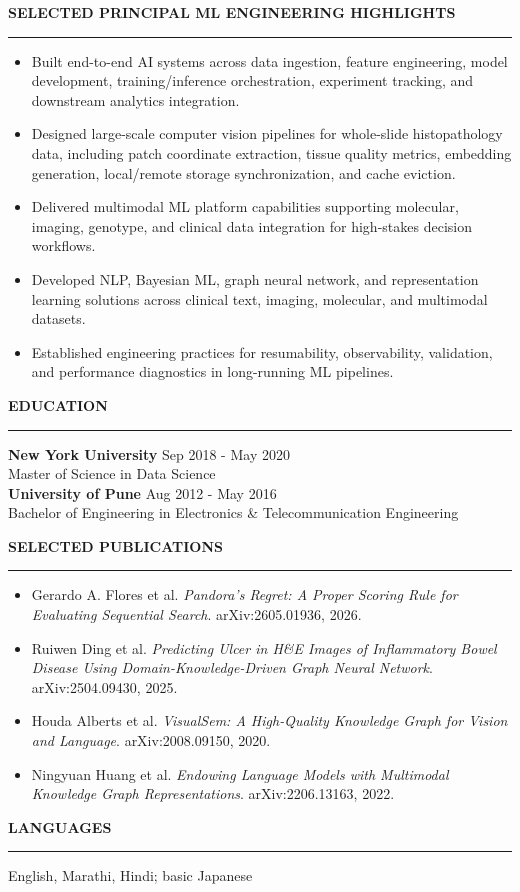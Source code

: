 \documentclass[10pt,letterpaper]{article}
\newcommand{\resumelist}{\begin{itemize}\setlength{\itemsep}{1.2pt}\setlength{\parskip}{0pt}\setlength{\parsep}{0pt}}
\newcommand{\resumelistend}{\end{itemize}}
\begin{document}
\vspace{6pt}\textcolor{accent}{\large\bfseries SELECTED PRINCIPAL ML ENGINEERING HIGHLIGHTS}\vspace{2pt}\hrule\vspace{4pt}
\resumelist
  \item Built end-to-end AI systems across data ingestion, feature engineering, model development, training/inference orchestration, experiment tracking, and downstream analytics integration.
  \item Designed large-scale computer vision pipelines for whole-slide histopathology data, including patch coordinate extraction, tissue quality metrics, embedding generation, local/remote storage synchronization, and cache eviction.
  \item Delivered multimodal ML platform capabilities supporting molecular, imaging, genotype, and clinical data integration for high-stakes decision workflows.
  \item Developed NLP, Bayesian ML, graph neural network, and representation learning solutions across clinical text, imaging, molecular, and multimodal datasets.
  \item Established engineering practices for resumability, observability, validation, and performance diagnostics in long-running ML pipelines.
\resumelistend

\vspace{6pt}\textcolor{accent}{\large\bfseries EDUCATION}\vspace{2pt}\hrule\vspace{4pt}
\textbf{New York University} \hfill Sep 2018 - May 2020\\
Master of Science in Data Science\\[2pt]
\textbf{University of Pune} \hfill Aug 2012 - May 2016\\
Bachelor of Engineering in Electronics \& Telecommunication Engineering

\vspace{6pt}\textcolor{accent}{\large\bfseries SELECTED PUBLICATIONS}\vspace{2pt}\hrule\vspace{4pt}
\resumelist
  \item Gerardo A. Flores et al. \textit{Pandora's Regret: A Proper Scoring Rule for Evaluating Sequential Search}. arXiv:2605.01936, 2026.
  \item Ruiwen Ding et al. \textit{Predicting Ulcer in H\&E Images of Inflammatory Bowel Disease Using Domain-Knowledge-Driven Graph Neural Network}. arXiv:2504.09430, 2025.
  \item Houda Alberts et al. \textit{VisualSem: A High-Quality Knowledge Graph for Vision and Language}. arXiv:2008.09150, 2020.
  \item Ningyuan Huang et al. \textit{Endowing Language Models with Multimodal Knowledge Graph Representations}. arXiv:2206.13163, 2022.
\resumelistend

\vspace{6pt}\textcolor{accent}{\large\bfseries LANGUAGES}\vspace{2pt}\hrule\vspace{4pt}
English, Marathi, Hindi; basic Japanese
\end{document}
